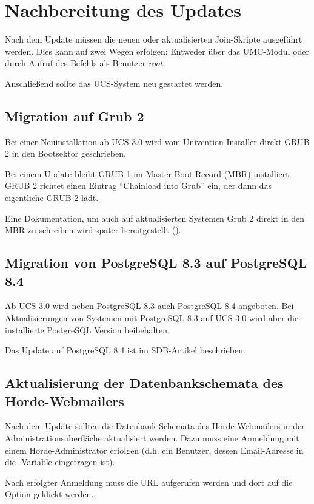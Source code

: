 \chapter{Nachbereitung des Updates}

Nach dem Update müssen die neuen oder aktualisierten Join-Skripte
ausgeführt werden. Dies kann auf zwei Wegen erfolgen: Entweder über
das UMC-Modul  oder durch Aufruf des
Befehls  als
Benutzer \emph{root}.

Anschließend sollte das UCS-System neu gestartet werden.

\section{Migration auf Grub 2}

Bei einer Neuinstallation ab UCS 3.0 wird vom Univention Installer direkt GRUB 2 in den
Bootsektor geschrieben.

Bei einem Update bleibt GRUB 1 im Master Boot Record (MBR) installiert. GRUB 2
richtet einen Eintrag ``Chainload into Grub'' ein, der dann das eigentliche
GRUB 2 lädt.

Eine Dokumentation, um auch auf aktualisierten Systemen Grub 2 direkt
in den MBR zu schreiben wird später bereitgestellt ().

\section{Migration von PostgreSQL 8.3 auf PostgreSQL 8.4}
Ab UCS 3.0 wird neben PostgreSQL 8.3 auch PostgreSQL 8.4
angeboten. Bei Aktualisierungen von Systemen mit PostgreSQL 8.3 auf
UCS 3.0 wird aber die installierte PostgreSQL Version beibehalten.

Das Update auf PostgreSQL 8.4 ist im
SDB-Artikel  beschrieben.

\section{Aktualisierung der Datenbankschemata des Horde-Webmailers}
Nach dem Update sollten die Datenbank-Schemata des Horde-Webmailers in
der Administrationsoberfläche aktualisiert werden. Dazu muss eine
Anmeldung mit einem Horde-Administrator erfolgen (d.h. ein
Benutzer, dessen Email-Adresse in die \ucsUCR{}-Variable 
eingetragen ist).

Nach erfolgter Anmeldung muss die
URL  aufgerufen werden und dort
auf die Option  geklickt werden.

